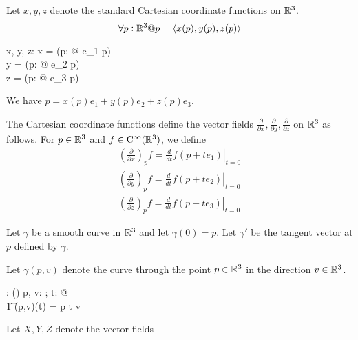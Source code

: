\documentclass[11pt, oneside]{article}
\begin{document}
Let $x, y, z$ denote the standard Cartesian coordinate functions on $\mathbb{R}^3$.
\begin{equation}
\forall p : \mathbb{R}^3 @ p = \langle x(p), y(p), z(p) \rangle
\end{equation}
\begin{axdef}
	x, y, z: \Rthree \fun \R
\where
	x = (\lambda p: \Rthree @ e_1 \dotR p) \\
	y = (\lambda p: \Rthree @ e_2 \dotR p) \\
	z = (\lambda p: \Rthree @ e_3 \dotR p)
\end{axdef}
\begin{remark}
We have $p = x(p) e_1 + y(p) e_2 + z(p) e_3$.
\end{remark}

The Cartesian coordinate functions define the vector fields $\frac{\partial}{\partial x}, \frac{\partial}{\partial y}, \frac{\partial}{\partial z}$
on $\mathbb{R}^3$ as follows. 
For $p \in \mathbb{R}^3$ and $f \in \operatorname{C^{\infty}}(\mathbb{R}^3)$, we define
\begin{align}
\left(\frac{\partial}{\partial x}\right)_p f = \left. \frac{d}{dt} f(p + t e_1) \right|_{t = 0} \\
\left(\frac{\partial}{\partial y}\right)_p f = \left. \frac{d}{dt} f(p + t e_2) \right|_{t = 0} \\
\left(\frac{\partial}{\partial z}\right)_p f = \left. \frac{d}{dt} f(p + t e_3) \right|_{t = 0}
\end{align}

Let $\gamma$ be a smooth curve in $\mathbb{R}^3$ and let $\gamma(0) = p$.
Let $\gamma'$ be the tangent vector at $p$ defined by $\gamma$.

Let $\gamma(p,v)$ denote the curve through the point $p \in \mathbb{R}^3$ in the direction $v \in \mathbb{R}^3$.
\begin{axdef}
	\gamma: \Rthree \cross \Rthree \fun (\R \fun \Rthree)
\where
	\forall p, v: \Rthree; t: \R @ \\
	\t1	\gamma(p,v)(t) = p \vaddR t \smulR v
\end{axdef}

Let $X, Y, Z$ denote the vector fields

\printbibliography
\end{document}
